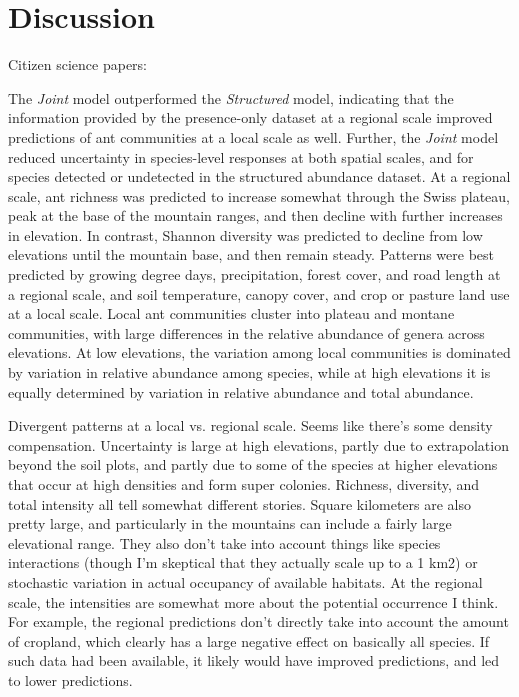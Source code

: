 \documentclass[preprint,review,times,12pt]{elsarticle}
\begin{document}
 




\section{Discussion}
\label{S:4}
Citizen science papers: \citep{Altwegg2019, Pernat2020, Henckel2020, Duan2020, Johnston2020,Robinson2020, Beck2010, Poisson2020}

The \emph{Joint} model outperformed the \emph{Structured} model, indicating that the information provided by the presence-only dataset at a regional scale improved predictions of ant communities at a local scale as well. Further, the \emph{Joint} model reduced uncertainty in species-level responses at both spatial scales, and for species detected or undetected in the structured abundance dataset. At a regional scale, ant richness was predicted to increase somewhat through the Swiss plateau, peak at the base of the mountain ranges, and then decline with further increases in elevation. In contrast, Shannon diversity was predicted to decline from low elevations until the mountain base, and then remain steady. Patterns were best predicted by growing degree days, precipitation, forest cover, and road length at a regional scale, and soil temperature, canopy cover, and crop or pasture land use at a local scale. Local ant communities cluster into plateau and montane communities, with large differences in the relative abundance of genera across elevations. At low elevations, the variation among local communities is dominated by variation in relative abundance among species, while at high elevations it is equally determined by variation in relative abundance and total abundance.

Divergent patterns at a local vs. regional scale. Seems like there's some density compensation. Uncertainty is large at high elevations, partly due to extrapolation beyond the soil plots, and partly due to some of the species at higher elevations that occur at high densities and form super colonies. Richness, diversity, and total intensity all tell somewhat different stories. Square kilometers are also pretty large, and particularly in the mountains can include a fairly large elevational range. They also don't take into account things like species interactions (though I'm skeptical that they actually scale up to a 1 km2) or stochastic variation in actual occupancy of available habitats. At the regional scale, the intensities are somewhat more about the potential occurrence I think. For example, the regional predictions don't directly take into account the amount of cropland, which clearly has a large negative effect on basically all species. If such data had been available, it likely would have improved predictions, and led to lower predictions.
\end{document}
